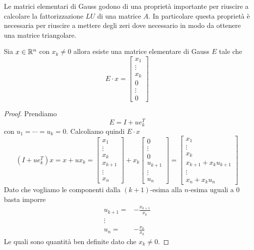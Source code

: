 Le matrici elementari di Gauss godono di una proprietà importante per riuscire a calcolare la fattorizzazione
$LU$ di una matrice $A$. In particolare questa proprietà è necessaria per riuscire a mettere degli zeri dove
necessario in modo da ottenere una matrice triangolare.

\begin{theorem}\label{th: eliminazione_gauss}
	Sia $x \in \mathbb{R}^n$ con $x_k \neq 0$ allora esiste una matrice elementare di Gauss $E$ tale che
	\[
		E \cdot x = \begin{bmatrix}
			x_1 \\ \vdots \\ x_k \\ 0 \\ \vdots \\ 0
		\end{bmatrix}
	\]
	\begin{proof}
		Prendiamo
		\[ E = I + u e_k^T \]
		con $u_1 = \cdots = u_k = 0$. Calcoliamo quindi $E \cdot x$
		\[
			(I + u e_k^T) x = x + u x_k =
			\begin{bmatrix}
				x_1 \\ \vdots \\ x_k \\ x_{k+1} \\ \vdots \\ x_n
			\end{bmatrix} + x_k
			\begin{bmatrix}
				0 \\ \vdots \\ 0 \\ u_{k+1} \\ \vdots \\ u_n
			\end{bmatrix} =
			\begin{bmatrix}
				x_1 \\ \vdots \\ x_k \\ x_{k+1} + x_k u_{k+1} \\ \vdots \\ x_n + x_k u_n
			\end{bmatrix}
		\]
		Dato che vogliamo le componenti dalla $(k+1)$-esima alla $n$-esima uguali a 0 basta imporre
		\begin{align*}
			u_{k+1} = & -\frac{x_{k+1}}{x_k} \\
			\vdots    &                      \\
			u_n =     & -\frac{x_n}{x_k}
		\end{align*}
		Le quali sono quantità ben definite dato che $x_k \neq 0$.
	\end{proof}
\end{theorem}

